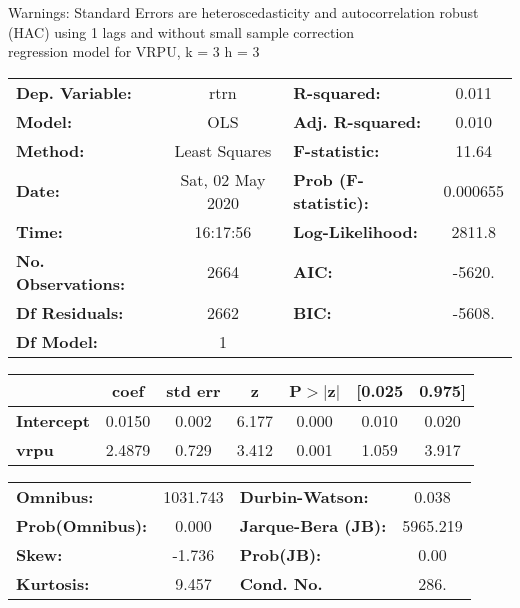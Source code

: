 Warnings: \newline
 [1] Standard Errors are heteroscedasticity and autocorrelation robust (HAC) using 1 lags and without small sample correction\\ 

regression model for VRPU, k = 3 h = 3\begin{center}
\begin{tabular}{lclc}
\toprule
\textbf{Dep. Variable:}    &       rtrn       & \textbf{  R-squared:         } &     0.011   \\
\textbf{Model:}            &       OLS        & \textbf{  Adj. R-squared:    } &     0.010   \\
\textbf{Method:}           &  Least Squares   & \textbf{  F-statistic:       } &     11.64   \\
\textbf{Date:}             & Sat, 02 May 2020 & \textbf{  Prob (F-statistic):} &  0.000655   \\
\textbf{Time:}             &     16:17:56     & \textbf{  Log-Likelihood:    } &    2811.8   \\
\textbf{No. Observations:} &        2664      & \textbf{  AIC:               } &    -5620.   \\
\textbf{Df Residuals:}     &        2662      & \textbf{  BIC:               } &    -5608.   \\
\textbf{Df Model:}         &           1      & \textbf{                     } &             \\
\bottomrule
\end{tabular}
\begin{tabular}{lcccccc}
                   & \textbf{coef} & \textbf{std err} & \textbf{z} & \textbf{P$> |$z$|$} & \textbf{[0.025} & \textbf{0.975]}  \\
\midrule
\textbf{Intercept} &       0.0150  &        0.002     &     6.177  &         0.000        &        0.010    &        0.020     \\
\textbf{vrpu}      &       2.4879  &        0.729     &     3.412  &         0.001        &        1.059    &        3.917     \\
\bottomrule
\end{tabular}
\begin{tabular}{lclc}
\textbf{Omnibus:}       & 1031.743 & \textbf{  Durbin-Watson:     } &    0.038  \\
\textbf{Prob(Omnibus):} &   0.000  & \textbf{  Jarque-Bera (JB):  } & 5965.219  \\
\textbf{Skew:}          &  -1.736  & \textbf{  Prob(JB):          } &     0.00  \\
\textbf{Kurtosis:}      &   9.457  & \textbf{  Cond. No.          } &     286.  \\
\bottomrule
\end{tabular}
\end{center}

